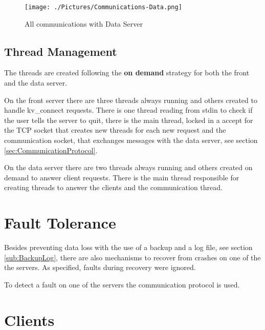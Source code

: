 \documentclass[12pt]{article} %
\begin{document}
\begin{figure}[H]
\centering
\texttt{[image: ./Pictures/Communications-Data.png]}
\caption{All communications with Data Server}\label{fig:CommunicationsData}
\end{figure}

\subsection{Thread Management}
\label{sub:ThreadManagement}

The threads are created following the \textbf{on demand} strategy for both the front and the data server.

On the front server there are three threads always running and others created to handle kv_connect requests. There is one thread reading from stdin to check if the user tells the server to quit, there is the main thread, locked in a accept for the TCP socket that creates new threads for each new request and the communication socket, that exchanges messages with the data server, see section \ref{sec:CommunicationProtocol}.

On the data server there are two threads always running and others created on demand to answer client requests. There is the main thread responsible for creating threads to answer the clients and the communication thread.

\section{Fault Tolerance}
\label{sec:FaultTolerance}

Besides preventing data loss with the use of a backup and a log file, see section \ref{sub:BackupLog}, there are also mechanisms to recover from crashes on one of the the servers. As specified, faults during recovery were ignored.

To detect a fault on one of the servers the communication protocol is used. %

\section{Clients}
\label{sec:Clients}
\end{document}
